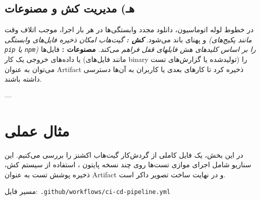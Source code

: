 \documentclass[12pt,a4paper,openany]{book}
\begin{document}
\subsection{هـ) مدیریت کش و مصنوعات }

در خطوط لوله اتوماسیون، دانلود مجدد وابستگی‌ها  در هر بار اجرا، موجب اتلاف وقت و پهنای باند می‌شود. \textit{ \textbf{کش :} گیت‌هاب امکان ذخیره فایل‌های وابستگی (مانند پکیج‌های \texttt{pip} یا \texttt{npm}) را بر اساس کلیدهای هش فایلهای قفل  فراهم می‌کند. } \textbf{مصنوعات :} فایل‌ها یا داده‌های خروجی یک کار (مانند فایل‌های binary تولیدشده یا گزارش‌های تست) را می‌توان به عنوان Artifact ذخیره کرد تا کارهای بعدی یا کاربران به آن‌ها دسترسی داشته باشند.

---

\section{مثال عملی}

در این بخش، یک فایل کاملی از گردش‌کار گیت‌هاب اکشنز را بررسی می‌کنیم. این سناریو شامل اجرای موازی تست‌ها روی چند نسخه پایتون ، استفاده از سیستم کش، ذخیره پوشش تست به عنوان Artifact و در نهایت ساخت تصویر داکر است.

مسیر فایل: \texttt{.github/workflows/ci-cd-pipeline.yml}
\end{document}
